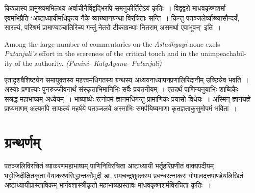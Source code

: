{किञ्चास्य प्रामुख्यमभिलक्ष्य अर्वाचीनैर्विद्वद्भिरपि समनुकीर्तितेऽयं कृतिः~। विद्वद्वरो माधवकृष्णशर्मा एवमभिप्रैति ‘अष्टाध्यायीमधिकृत्य नैके व्याख्यानग्रन्था विरचिताः सन्ति~। किन्तु पतञ्जलेर्व्याख्यासौन्दर्यं, सारल्यं, परिश्रमं प्रामाण्यञ्चातिरिच्य गन्तुं नेतरो टीकाग्रन्थाः नितराम् असमर्था एवाभूवन्’ इति~। 
\begin{english}
{\fontsize{12}{14}\selectfont
Among the large number of commentaries on the \textit{Astadhyayi} none exels \textit{Patanjali’s} effort in the scereness of the critical touch and in the unimpeachability of the authority. \textit{(Panini- KatyAyana- Patanjali)}}
\end{english}

एतादृशवैशिष्ट्येन समायुक्तस्य महत्त्वमधिगतस्य ग्रन्थस्य अध्ययनाध्यापनप्रणा\-लिरिदानीम् उच्छिन्नेव भवति~। अस्याः प्रणाल्याः पुनरुज्जीवनार्थं संस्कृताभिमानिभिः सर्वैः प्रयतनीयम्~। एतदर्थं पाणिन्यनुयाभिः शाब्दिकैः सश्रद्धं महाभाष्यम् अध्येयम्~। भाष्याब्धेः रत्नोपमं ज्ञानमधिगन्तुं प्रामाणिकः प्रयासो विधेयः~। अस्मिन् ज्ञानयज्ञे प्राप्यमाणम् अल्पमपि साफल्यं महर्षये पतञ्जलये अस्माभिः समर्पयिष्यमाणा कृतज्ञताकुसुमोपमं भविता~। 

\section*{ग्रन्थर्णम्}

\begin{thebibliography}{99}
 पतञ्जलिविरचितं व्याकरणमहाभाष्यम्
 पाणिनिविरचिता अष्टाध्यायी
 भर्तृहरिप्रणीतं वाक्यपदीयम्
 भट्टोजिदीक्षितकृता वैयाकरणसिद्धान्तकौमुदी
 डा. रामचन्द्रशुक्लस्य प्रबन्धरत्नाकरः
 गोपालदत्तपाण्डेयलिखितं अष्टाध्यायीप्रास्ताविकम्
 भार्गवशास्त्रीकृतो महाभाष्यप्रस्तावः
 माधवकृष्णशर्मविरचिता {\fontsize{12}{14}\selectfont{}} कृतिः~। 
\end{thebibliography}
\articleend
}

